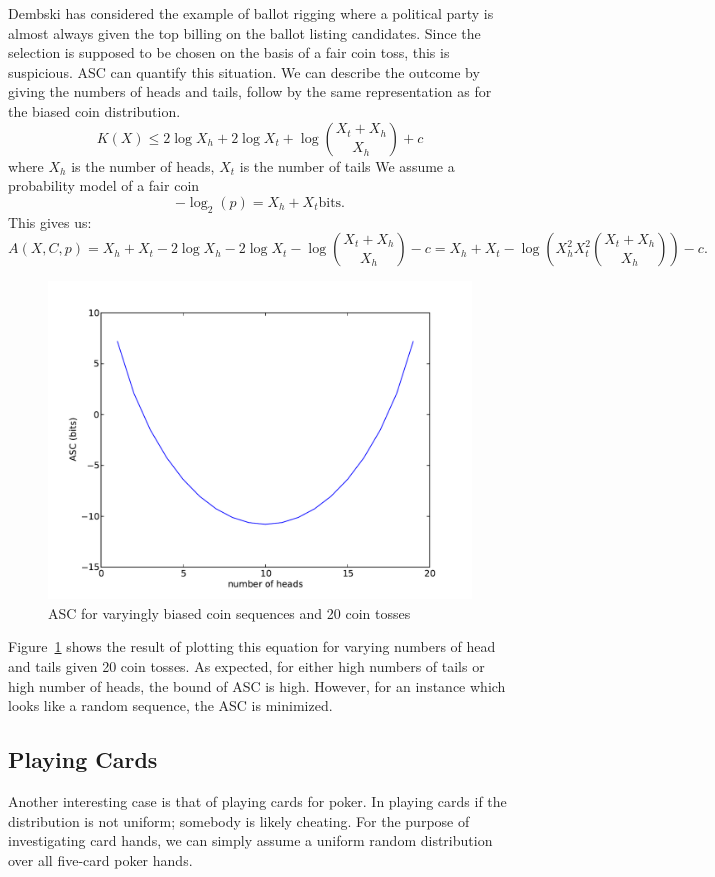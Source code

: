 Dembski \citep{Dembski1998} has considered the example of ballot rigging where a political party is almost always given the top billing on the ballot listing candidates.
Since the selection is supposed to be chosen on the basis of a fair coin toss, this is suspicious.
ASC can quantify this situation.
We can describe the outcome by giving the numbers of heads and tails, follow by the same representation as for the biased coin distribution.
\begin{equation}
    K(X) \leq 2 \log X_h + 2 \log X_t + \log {X_t + X_h \choose X_h} + c
\end{equation} where $X_h$ is the number of heads, $X_t$ is the number of tails
We assume a probability model of a fair coin
\begin{equation}
    -\log_2(p) = X_h + X_t \mbox{bits.}
\end{equation}
This gives us:
\begin{equation}
    A(X,C,p) = X_h + X_t - 2 \log X_h -  2 \log X_t - \log {X_t + X_h \choose X_h} - c
    = X_h + X_t - \log \left( X_h^2 X_t^2 {X_t + X_h \choose X_h} \right) - c \mbox{.}
\end{equation}
\begin{figure}
    \includegraphics[width=.5\textwidth]{EwertCoin}
    \caption{ASC for varyingly biased coin sequences and 20 coin tosses}
    \label{fig_coins}
\end{figure}
Figure~\ref{fig_coins} shows the result of plotting this equation for varying numbers of head and tails given 20 coin tosses.
As expected, for either high numbers of tails or high number of heads, the bound of ASC is high.
However, for an instance which looks like a random sequence, the ASC is minimized.


\subsection{Playing Cards}

Another interesting case is that of playing cards for poker.
In playing cards if the distribution is not uniform; somebody is likely cheating.
For the purpose of investigating card hands, we can simply assume a uniform random distribution over all five-card poker hands.

